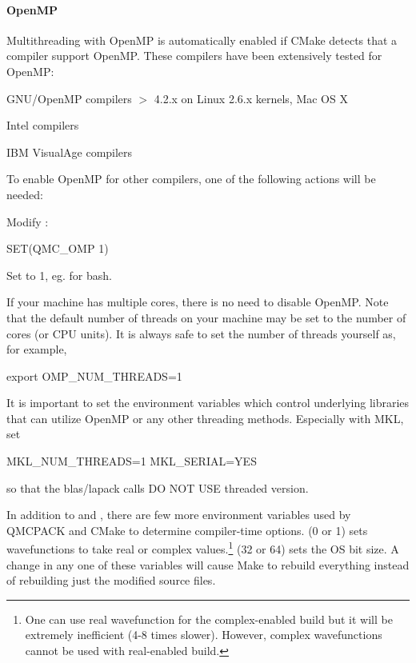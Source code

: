 \paragraph{OpenMP}
Multithreading with OpenMP is automatically enabled if CMake detects that a compiler
support OpenMP. These compilers have been extensively tested for OpenMP:
\begin{itemize*}
  \item{} GNU/OpenMP compilers $>$ 4.2.x on Linux 2.6.x kernels, Mac OS X 
  \item{} Intel compilers
  \item{} IBM VisualAge compilers
\end{itemize*}
To enable OpenMP for other compilers, one of the following actions will be needed:
\begin{itemize*}
  \item{} Modify :
\begin{code}
SET(QMC_OMP 1)
\end{code}
  \item{} Set  to 1, eg.  for bash.
\end{itemize*}

If your machine has multiple cores, there is no need to disable OpenMP.
Note that the default number of threads on your machine may be set to the
number of cores (or CPU units). It is always safe to set the number of threads
yourself as, for example, 
\begin{code}
export OMP_NUM_THREADS=1
\end{code}
It is important to set the  environment variables which control underlying
libraries that can utilize OpenMP or any other threading methods.  Especially
with MKL, set
\begin{code}
MKL_NUM_THREADS=1
MKL_SERIAL=YES
\end{code}
so that the blas/lapack calls DO NOT USE threaded version.

In addition to  and , there are few more
environment variables used by QMCPACK and CMake to determine compiler-time
options.  (0 or 1) sets wavefunctions to take real or
complex values.\footnote{One can use real wavefunction for the complex-enabled
build but it will be extremely inefficient (4-8 times slower). However, complex
wavefunctions cannot be used with real-enabled build.}   (32
or 64) sets the OS bit size.  A change in any one of these variables will cause
Make to rebuild everything instead of rebuilding just the modified source
files.

